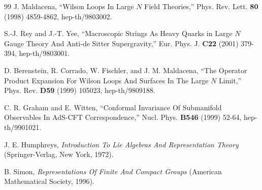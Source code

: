\begin{thebibliography}{99}
 J. Maldacena, ``Wilson Loops In Large $N$ Field
Theories,'' Phys. Rev. Lett. {\bf 80}
(1998) 4859-4862, hep-th/9803002.

 S.-J. Rey and J.-T. Yee, ``Macroscopic Strings As Heavy Quarks
in Large $N$ Gauge Theory And Anti-de Sitter Supergravity,'' Eur. Phys. J. {\bf C22} (2001) 379-394,
hep-th/9803001.

 D. Berenstein, R. Corrado, W. Fischler, and J. M. Maldacena, ``The Operator
Product Expansion For Wilson Loops And Surfaces In The Large $N$ Limit,'' Phys. Rev.
{\bf D59} (1999) 105023, hep-th/9809188.

 C. R. Graham and E. Witten, ``Conformal Invariance Of Submanifold Observables In
AdS-CFT Correspondence,'' Nucl. Phys. {\bf B546} (1999) 52-64, hep-th/9901021.

 J. E.
Humphreys, {\it Introduction To Lie Algebras And Representation Theory} (Springer-Verlag, New York,
1972).

 B. Simon, {\it Representations Of Finite And Compact Groups}
(American Mathematical Society, 1996).

\end{thebibliography}
